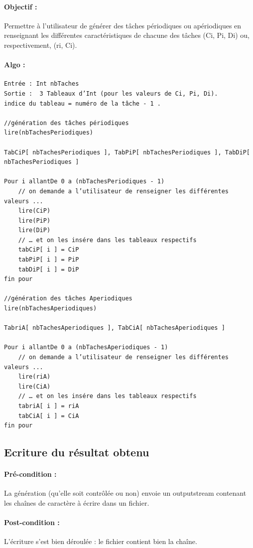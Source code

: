 		\paragraph{Objectif :} Permettre à l’utilisateur de générer des tâches périodiques ou apériodiques en renseignant les différentes caractéristiques de chacune des tâches (Ci, Pi, Di) ou, respectivement, (ri, Ci).
		\paragraph{Algo :} 
			\begin{verbatim}
Entrée : Int nbTaches
Sortie :  3 Tableaux d’Int (pour les valeurs de Ci, Pi, Di). 
indice du tableau = numéro de la tâche - 1 .

//génération des tâches périodiques
lire(nbTachesPeriodiques)

TabCiP[ nbTachesPeriodiques ], TabPiP[ nbTachesPeriodiques ], TabDiP[ nbTachesPeriodiques ]
		
Pour i allantDe 0 a (nbTachesPeriodiques - 1)
	// on demande a l’utilisateur de renseigner les différentes valeurs ...
	lire(CiP)
	lire(PiP)
	lire(DiP)        
	// … et on les insére dans les tableaux respectifs
	tabCiP[ i ] = CiP
	tabPiP[ i ] = PiP
	tabDiP[ i ] = DiP
fin pour

//génération des tâches Aperiodiques
lire(nbTachesAperiodiques)

TabriA[ nbTachesAperiodiques ], TabCiA[ nbTachesAperiodiques ]
		
Pour i allantDe 0 a (nbTachesAperiodiques - 1)
	// on demande a l’utilisateur de renseigner les différentes valeurs ...
	lire(riA)
	lire(CiA)        
	// … et on les insére dans les tableaux respectifs
	tabriA[ i ] = riA
	tabCiA[ i ] = CiA
fin pour

			\end{verbatim}

	\subsection{Ecriture du résultat obtenu}
		\paragraph{Pré-condition :} La génération (qu'elle soit contrôlée ou non) envoie un outputstream contenant les chaînes de caractère à écrire dans un fichier.
		\paragraph{Post-condition :} L'écriture s'est bien déroulée : le fichier contient bien la chaîne.
